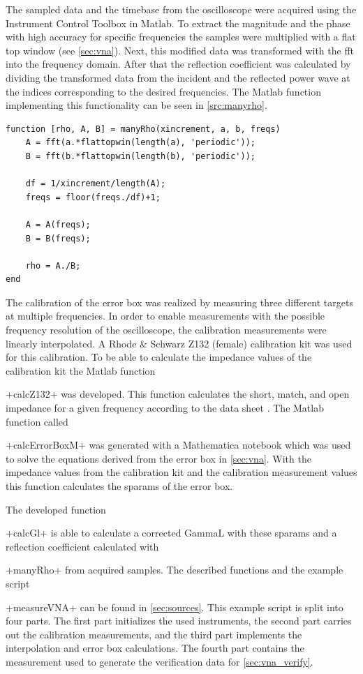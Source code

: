 \documentclass[12pt,a4paper,parskip=full,abstract=true,BCOR=12mm,twoside,open=right]{scrreprt}
\newcommand{\hack}{}
\newcommand*{\SavedLstInline}{}
\DeclareRobustCommand*{\lstinline}{%
  \ifmmode
    \let\SavedBGroup\bgroup
    \def\bgroup{%
      \let\bgroup\SavedBGroup
      \hbox\bgroup
    }%
  \fi
  \SavedLstInline
}
\begin{document}
The sampled data and the timebase from the oscilloscope were acquired using the
Instrument Control Toolbox in Matlab. To extract the magnitude and the phase
with high accuracy for specific frequencies the samples were multiplied with
a flat top window (see \cref{sec:vna}). Next, this modified data was transformed
with the \gls{fft} into the frequency domain. After that the reflection coefficient
was calculated by dividing the transformed data from the incident and the reflected
power wave at the indices corresponding to the desired frequencies. The Matlab
function implementing this functionality can be seen in \cref{src:manyrho}.

\begin{lstlisting}[float=htb,caption={Function for calculating $\frac{\gls{a}}{\gls{b}}$ from sampled data at multiple frequencies},label=src:manyrho,basicstyle=\hack\scriptsize]
function [rho, A, B] = manyRho(xincrement, a, b, freqs)
    A = fft(a.*flattopwin(length(a), 'periodic'));
    B = fft(b.*flattopwin(length(b), 'periodic'));

    df = 1/xincrement/length(A);
    freqs = floor(freqs./df)+1;

    A = A(freqs);
    B = B(freqs);

    rho = A./B;
end
\end{lstlisting}

The calibration of the error box was realized by measuring three different targets
at multiple frequencies. In order to enable measurements with the possible
frequency resolution of the oscilloscope, the calibration measurements were
linearly interpolated. A Rhode \& Schwarz Z132 (female) calibration kit was used
for this calibration. To be able to calculate the impedance values of the
calibration kit the Matlab function \lstinline+calcZ132+ was developed. This function
calculates the short, match, and open impedance for a given frequency according to
the data sheet \cite{zv-z132}. The Matlab function called \lstinline+calcErrorBoxM+ was
generated with a Mathematica notebook which was used to solve the equations
derived from the error box in \cref{sec:vna}. With the impedance values from
the calibration kit and the calibration measurement values this function calculates
the \glspl{sparam} of the error box.

The developed function \lstinline+calcGl+ is able to calculate a corrected \gls{GammaL}
with these \glspl{sparam} and a reflection coefficient calculated with \lstinline+manyRho+
from acquired samples. The described functions and the example script \lstinline+measureVNA+
can be found in \cref{sec:sources}. This example script is split into four parts. The
first part initializes the used instruments, the second part carries out the
calibration measurements, and the third part implements the interpolation
and error box calculations. The fourth part contains the measurement used to generate
the verification data for \cref{sec:vna_verify}.
\end{document}
